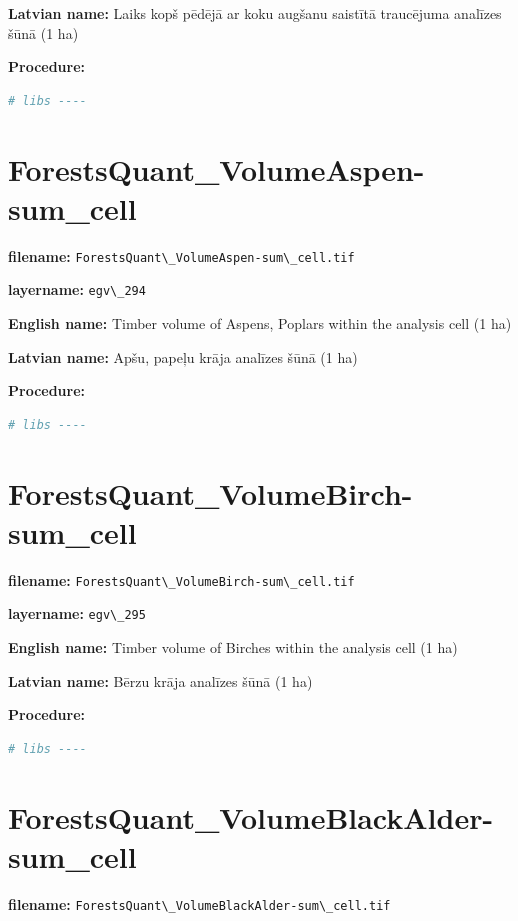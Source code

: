 \documentclass[
]{book}
\newcommand{\passthrough}[1]{#1}
\begin{document}
\textbf{Latvian name:} Laiks kopš pēdējā ar koku augšanu saistītā traucējuma analīzes šūnā (1 ha)

\textbf{Procedure:}

\begin{lstlisting}[language=R]
# libs ----
\end{lstlisting}

\section{ForestsQuant\_VolumeAspen-sum\_cell}\label{ch06.294}

\textbf{filename:} \passthrough{\lstinline!ForestsQuant\_VolumeAspen-sum\_cell.tif!}

\textbf{layername:} \passthrough{\lstinline!egv\_294!}

\textbf{English name:} Timber volume of Aspens, Poplars within the analysis cell (1 ha)

\textbf{Latvian name:} Apšu, papeļu krāja analīzes šūnā (1 ha)

\textbf{Procedure:}

\begin{lstlisting}[language=R]
# libs ----
\end{lstlisting}

\section{ForestsQuant\_VolumeBirch-sum\_cell}\label{ch06.295}

\textbf{filename:} \passthrough{\lstinline!ForestsQuant\_VolumeBirch-sum\_cell.tif!}

\textbf{layername:} \passthrough{\lstinline!egv\_295!}

\textbf{English name:} Timber volume of Birches within the analysis cell (1 ha)

\textbf{Latvian name:} Bērzu krāja analīzes šūnā (1 ha)

\textbf{Procedure:}

\begin{lstlisting}[language=R]
# libs ----
\end{lstlisting}

\section{ForestsQuant\_VolumeBlackAlder-sum\_cell}\label{ch06.296}

\textbf{filename:} \passthrough{\lstinline!ForestsQuant\_VolumeBlackAlder-sum\_cell.tif!}
\end{document}
